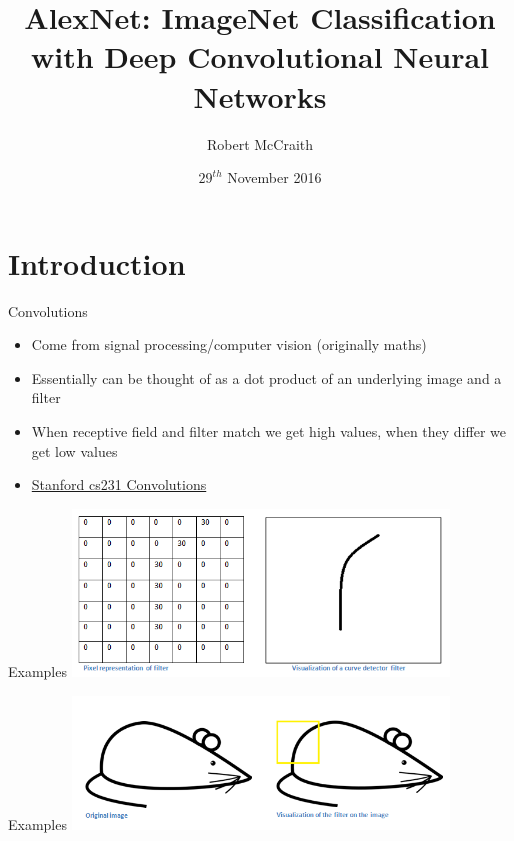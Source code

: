 \documentclass{beamer}
\title[AlexNet]{AlexNet: ImageNet Classification with Deep Convolutional Neural Networks}
\author{Robert McCraith}
\institute{Maynooth University}
\date{$29^{th}$ November 2016}
\begin{document}
\begin{frame}
  \titlepage
\end{frame}


\section{Introduction}




\begin{frame}{Convolutions}
\begin{itemize}
  \item Come from signal processing/computer vision (originally maths)
  \item Essentially can be thought of as a dot product of an underlying image and a filter
  \item When receptive field and filter match we get high values, when they differ we get low values	
  \item \href{http://cs231n.github.io/convolutional-networks/}{Stanford cs231 Convolutions}
\end{itemize}

\end{frame}

\begin{frame}{Examples}
	\includegraphics[width=10cm, keepaspectratio]{filter.png}
\end{frame}

\begin{frame}{Examples}
	\includegraphics[width=10cm, keepaspectratio]{mouse}
\end{frame}
\end{document}
